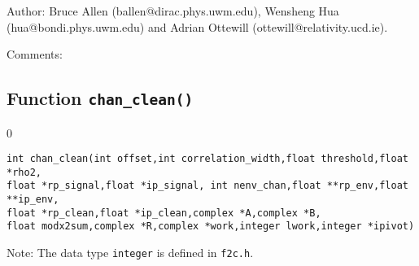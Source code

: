 \begin{description}
\item{Author:}
Bruce Allen (ballen@dirac.phys.uwm.edu), Wensheng Hua (hua@bondi.phys.uwm.edu)
  and Adrian Ottewill (ottewill@relativity.ucd.ie).
\item{Comments:}

\end{description}
\clearpage

\subsection{Function {\tt chan\_clean()}}

\setcounter{equation}0

{\tt int chan\_clean(int offset,int correlation\_width,float
  threshold,float *rho2,\\
float *rp\_signal,float *ip\_signal,
               int nenv\_chan,float **rp\_env,float **ip\_env,\\
float *rp\_clean,float *ip\_clean,complex *A,complex *B,\\
               float modx2sum,complex *R,complex *work,integer lwork,integer *ipivot)}

\begin{description}
\item{Note:} The data type {\tt integer} is defined in {\tt f2c.h}.
\end{description}


